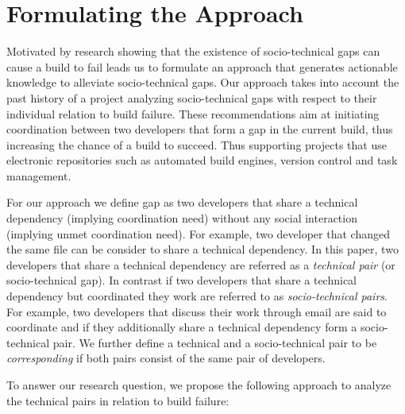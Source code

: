 \documentclass[conference]{IEEEtran}
\begin{document}


%
%
%

\section{Formulating the Approach}
Motivated by research showing that the existence of socio-technical gaps can cause a build to fail leads us to formulate an approach that generates actionable knowledge to alleviate socio-technical gaps.
Our approach takes into account the past history of a project analyzing socio-technical gaps with respect to their individual relation to build failure.
These recommendations aim at initiating coordination between two developers that form a gap in the current build, thus increasing the chance of a build to succeed.
Thus supporting projects that use electronic repositories such as automated build engines, version control and task management.

For our approach we define gap as two developers that share a technical dependency (implying coordination need) without any social interaction (implying unmet coordination need).
For example, two developer that changed the same file can be consider to share a technical dependency.
In this paper, two developers that share a technical dependency are referred as a \emph{technical pair} (or socio-technical gap).
In contrast if two developers that share a technical dependency but coordinated they work are referred to as  \emph{socio-technical pairs}.
For example, two developers that discuss their work through email are said to coordinate and if they additionally share a technical dependency form a socio-technical pair.
%
We further define a technical and a socio-technical pair to be \emph{corresponding} if both pairs consist of the same pair of developers.

To answer our research question, we propose the following approach to analyze the technical pairs in relation to build failure:
\end{document}
